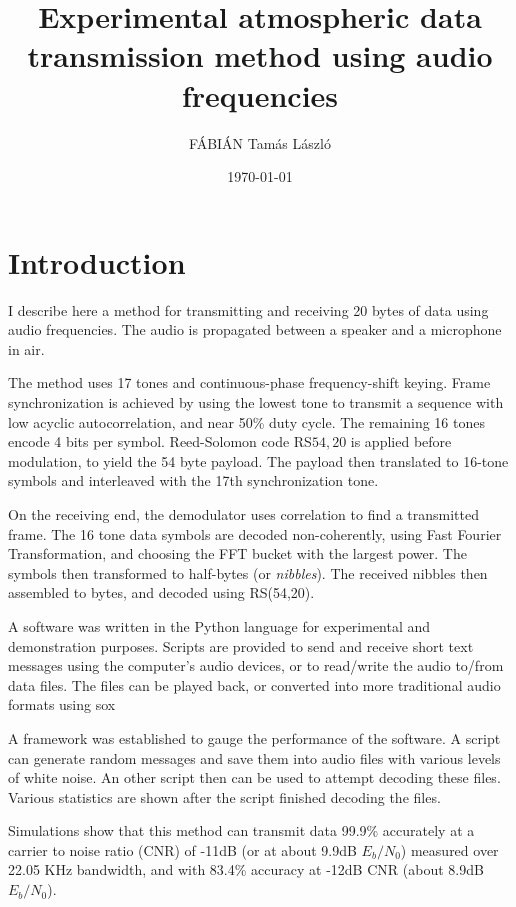 \documentclass[a4paper]{article}
\title{Experimental atmospheric data transmission method using audio 
frequencies}
\author{FÁBIÁN Tamás László}
\date{\today}
\begin{document}
\maketitle

\begin{abstract}

\end{abstract}

\section{Introduction} \label{sec:introduction} I describe here a 
method for transmitting and receiving 20 bytes of data using audio 
frequencies. The audio is propagated between a speaker and a microphone 
in air.

The method uses 17 tones and continuous-phase frequency-shift keying. 
Frame synchronization is achieved by using the lowest tone to transmit 
a sequence with low acyclic autocorrelation, and near 50\% duty cycle. 
The remaining 16 tones encode 4 bits per symbol. Reed-Solomon code 
RS\(54,20\) is applied before modulation, to yield the 54 byte payload. 
The payload then translated to 16-tone symbols and interleaved with the 
17th synchronization tone.

On the receiving end, the demodulator uses correlation to find a 
transmitted frame. The 16 tone data symbols are decoded non-coherently, 
using Fast Fourier Transformation, and choosing the FFT bucket with the 
largest power. The symbols then transformed to half-bytes (or 
\textit{nibbles}). The received nibbles then assembled to bytes, and 
decoded using RS(54,20).

A software was written in the Python language for experimental and 
demonstration purposes. Scripts are provided to send and receive short 
text messages using the computer's audio devices, or to read/write the 
audio to/from data files. The files can be played back, or converted 
into more traditional audio formats using sox\cite{sox1}

A framework was established to gauge the performance of the software. A 
script can generate random messages and save them into audio files with 
various levels of white noise. An other script then can be used to 
attempt decoding these files. Various statistics are shown after the 
script finished decoding the files.

Simulations show that this method can transmit data 99.9\% accurately 
at a carrier to noise ratio (CNR) of -11dB (or at about 9.9dB 
$E_b/N_0$) measured over 22.05 KHz bandwidth, and with 83.4\% accuracy 
at -12dB CNR (about 8.9dB $E_b/N_0$).
\end{document}
